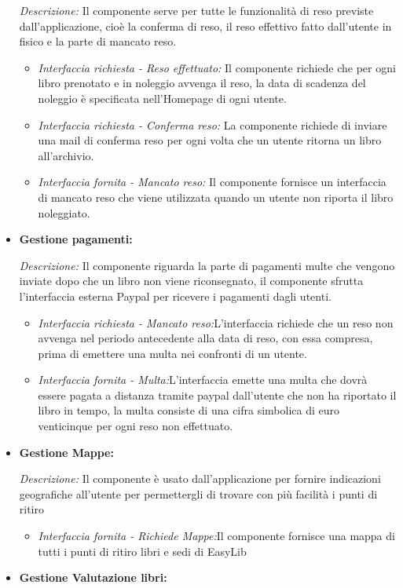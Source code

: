 \documentclass{article}
\begin{document}
\begin{itemize}
    \textit{Descrizione:} Il componente serve per tutte le funzionalità di reso previste dall’applicazione, cioè la conferma di reso, il reso effettivo fatto dall’utente in fisico e la parte di mancato reso.
    \begin{itemize}
        \item \textit{Interfaccia richiesta - Reso effettuato:} Il componente richiede che per ogni libro prenotato e in noleggio avvenga il reso, la data di scadenza del noleggio è specificata nell’Homepage di ogni utente.
        \item \textit{Interfaccia richiesta - Conferma reso:} La componente richiede di inviare una mail di conferma reso per ogni volta che un utente ritorna un libro all’archivio.
        \item \textit{Interfaccia fornita - Mancato reso:} Il componente fornisce un interfaccia di mancato reso che viene utilizzata quando un utente non riporta il libro noleggiato.
    \end{itemize}
    \item \textbf{Gestione pagamenti:}
    
    \textit{Descrizione:} Il componente riguarda la parte di pagamenti multe che vengono inviate dopo che un libro non viene riconsegnato, il componente sfrutta l’interfaccia esterna Paypal per ricevere i pagamenti dagli utenti.
    
    \begin{itemize}
        \item \textit{Interfaccia richiesta - Mancato reso:}L’interfaccia richiede che un reso non avvenga nel periodo antecedente alla data di reso, con essa compresa,  prima di emettere una multa nei confronti di un utente.
        \item \textit{Interfaccia fornita - Multa:}L’interfaccia emette una multa che dovrà essere pagata a distanza tramite paypal dall’utente che non ha riportato il libro in tempo, la multa consiste di una cifra simbolica di euro venticinque per ogni reso non effettuato.
    \end{itemize}
    \item \textbf{Gestione Mappe:}

    \textit{Descrizione:} Il componente è usato dall’applicazione per fornire indicazioni geografiche all'utente per permettergli di trovare con più facilità i punti di ritiro
    \begin{itemize}
        \item \textit{Interfaccia fornita - Richiede Mappe:}Il componente fornisce una mappa di tutti i punti di ritiro libri e sedi di EasyLib
    \end{itemize}
    \item \textbf{Gestione Valutazione libri:}
    

\end{itemize}
\end{document}

